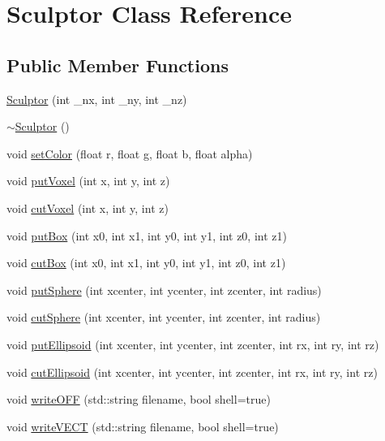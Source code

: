 \hypertarget{class_sculptor}{}\section{Sculptor Class Reference}
\label{class_sculptor}
\subsection*{Public Member Functions}
\begin{DoxyCompactItemize}
\item 
\mbox{\hyperlink{class_sculptor_a014e3ef5517bf0e9d9e14486b6ac6433}{Sculptor}} (int \+\_\+nx, int \+\_\+ny, int \+\_\+nz)
\item 
\mbox{\hyperlink{class_sculptor_a8f159bf97458326f16d2e238e11be7ff}{$\sim$\+Sculptor}} ()
\item 
void \mbox{\hyperlink{class_sculptor_af1d69da01379874b0dfd6454787cb562}{set\+Color}} (float r, float g, float b, float alpha)
\item 
void \mbox{\hyperlink{class_sculptor_a4bdea3048b419d58e93074060eaa7b52}{put\+Voxel}} (int x, int y, int z)
\item 
void \mbox{\hyperlink{class_sculptor_ad9d714a35fc8ae16d06eb5df37c3493c}{cut\+Voxel}} (int x, int y, int z)
\item 
void \mbox{\hyperlink{class_sculptor_a311ad7a0fb83fc67ac1f378be8e99fe1}{put\+Box}} (int x0, int x1, int y0, int y1, int z0, int z1)
\item 
void \mbox{\hyperlink{class_sculptor_aa84a1b12b09e9e103fc8d78f8d1bc00f}{cut\+Box}} (int x0, int x1, int y0, int y1, int z0, int z1)
\item 
void \mbox{\hyperlink{class_sculptor_a794a2b6ee8fc8098fd6150cb46101fc6}{put\+Sphere}} (int xcenter, int ycenter, int zcenter, int radius)
\item 
void \mbox{\hyperlink{class_sculptor_a67ab8c0ba5116adb8af1d01ad373ac15}{cut\+Sphere}} (int xcenter, int ycenter, int zcenter, int radius)
\item 
void \mbox{\hyperlink{class_sculptor_a093615b0c2b9b3a17a56300b9b939f39}{put\+Ellipsoid}} (int xcenter, int ycenter, int zcenter, int rx, int ry, int rz)
\item 
void \mbox{\hyperlink{class_sculptor_a18d2922c111c4c13653ee07d878151ad}{cut\+Ellipsoid}} (int xcenter, int ycenter, int zcenter, int rx, int ry, int rz)
\item 
void \mbox{\hyperlink{class_sculptor_ad81d742bdd882deb6ed4a3b2de036659}{write\+O\+FF}} (std\+::string filename, bool shell=true)
\item 
void \mbox{\hyperlink{class_sculptor_a5a83472a0430fa9492e7a9ff5926dedb}{write\+V\+E\+CT}} (std\+::string filename, bool shell=true)
\end{DoxyCompactItemize}
